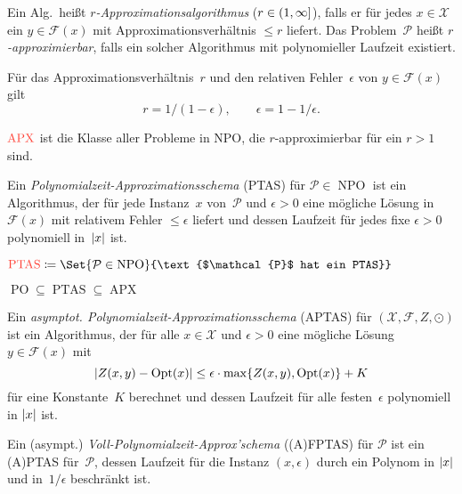 \documentclass{cheat-sheet}
\newcommand{\Instances}{\mathcal{X}} %
\newcommand{\Feasible}{\mathcal{F}} %
\newcommand{\ObjFun}{Z} %
\newcommand{\Goal}{\odot} %
\newcommand{\OptTuple}{(\Instances{}, \Feasible{}, \ObjFun{}, \Goal)} %
\DeclareMathOperator{\Opt}{Opt} %
\newcommand{\size}[1]{\abs{#1}} %
\DeclareMathOperator{\NPO}{NPO} %
\DeclareMathOperator{\PO}{PO} %
\DeclareMathOperator{\APX}{APX} %
\DeclareMathOperator{\PTAS}{PTAS} %
\newcommand{\Prob}{\mathcal{P}} %
\newcommand{\Defn}[1]{\textcolor{DefinitionColor}{#1}}
\begin{document}
\begin{defn}
  Ein Alg.\ heißt \emph{$r$-Approximationsalgorithmus} ($r \in \left( 1, \infty \right]$), falls er für jedes $x \in \Instances$ ein $y \in \Feasible(x)$ mit Approximationsverhältnis $\leq r$ liefert.
  Das Problem~$\Prob$ heißt \emph{$r$-approximierbar}, falls ein solcher Algorithmus mit polynomieller Laufzeit existiert.
\end{defn}

\begin{bem}
  Für das Approximationsverhältnis~$r$ und den relativen Fehler~$\epsilon$ von $y \in \Feasible(x)$ gilt
  \[
    r = 1 / (1-\epsilon), \qquad
    \epsilon = 1 - 1/\epsilon.
  \]
\end{bem}

\begin{defn}
  $\Defn{\APX}$ ist die Klasse aller Probleme in NPO, die $r$-approximierbar für ein $r > 1$ sind.
\end{defn}

\begin{defn}
  Ein \emph{Polynomialzeit-Approximationsschema} (PTAS) für $\Prob \in \NPO$ ist ein Algorithmus, der für jede Instanz~$x$ von~$\Prob$ und $\epsilon > 0$ eine mögliche Lösung in~$\Feasible(x)$ mit relativem Fehler $\leq \epsilon$ liefert und dessen Laufzeit für jedes fixe $\epsilon > 0$ polynomiell in~$\size{x}$ ist.
\end{defn}

\begin{defn}
  $\Defn{\PTAS} \coloneqq \Set{\Prob \in \NPO}{\text{$\Prob$ hat ein PTAS}}$
\end{defn}

\begin{bem}
  $\PO \subseteq \PTAS \subseteq \APX$
\end{bem}

\begin{defn}
  Ein \emph{asymptot. Polynomialzeit-Approximationsschema} (APTAS) für $\OptTuple{}$ ist ein Algorithmus, der für alle $x \in \Instances{}$ und $\epsilon > 0$ eine mögliche Lösung $y \in \Feasible(x)$ mit
  \[ \abs{Z(x, y) - \Opt(x)} \leq \epsilon \cdot \max \{ Z(x,y), \Opt(x) \} + K \]
  für eine Konstante~$K$ berechnet und dessen Laufzeit für alle festen~$\epsilon$ polynomiell in $\size{x}$ ist.
\end{defn}

\begin{defn}
  Ein (asympt.) \emph{Voll-Polynomialzeit-Approx'schema} ((A)FPTAS) für $\Prob{}$ ist ein (A)PTAS für~$\Prob{}$, dessen Laufzeit für die Instanz $(x, \epsilon)$ durch ein Polynom in $\size{x}$ und in~$1/\epsilon$ beschränkt ist.
\end{defn}
\end{document}
